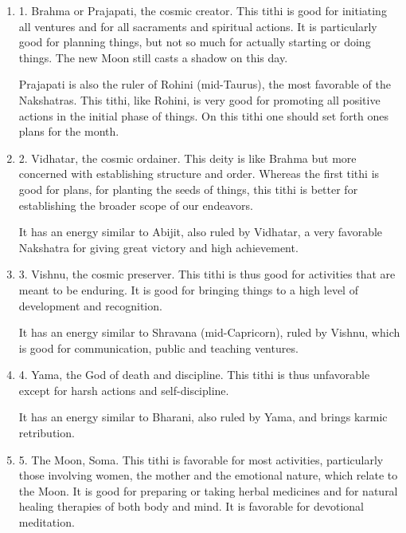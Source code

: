 \begin{enumerate}

\item[ ] 1. Brahma or Prajapati, the cosmic creator. This tithi is good for initiating all ventures and for all sacraments and spiritual actions. It is particularly good for planning things, but not so much for actually starting or doing things. The new Moon still casts a shadow on this day.

Prajapati is also the ruler of Rohini (mid-Taurus), the most favorable of the Nakshatras. This tithi, like Rohini, is very good for promoting all positive actions in the initial phase of things. On this tithi one should set forth ones plans for the month.

 

\item[ ] 2. Vidhatar, the cosmic ordainer. This deity is like Brahma but more concerned with establishing structure and order. Whereas the first tithi is good for plans, for planting the seeds of things, this tithi is better for establishing the broader scope of our endeavors.

It has an energy similar to Abijit, also ruled by Vidhatar, a very favorable Nakshatra for giving great victory and high achievement.

 

\item[ ] 3. Vishnu, the cosmic preserver. This tithi is thus good for activities that are meant to be enduring. It is good for bringing things to a high level of development and recognition.

It has an energy similar to Shravana (mid-Capricorn), ruled by Vishnu, which is good for communication, public and teaching ventures.

 

\item[ ] 4. Yama, the God of death and discipline. This tithi is thus unfavorable except for harsh actions and self-discipline.

It has an energy similar to Bharani, also ruled by Yama, and brings karmic retribution.

 

\item[ ] 5. The Moon, Soma. This tithi is favorable for most activities, particularly those involving women, the mother and the emotional nature, which relate to the Moon. It is good for preparing or taking herbal medicines and for natural healing therapies of both body and mind. It is favorable for devotional meditation.


\end{enumerate}
